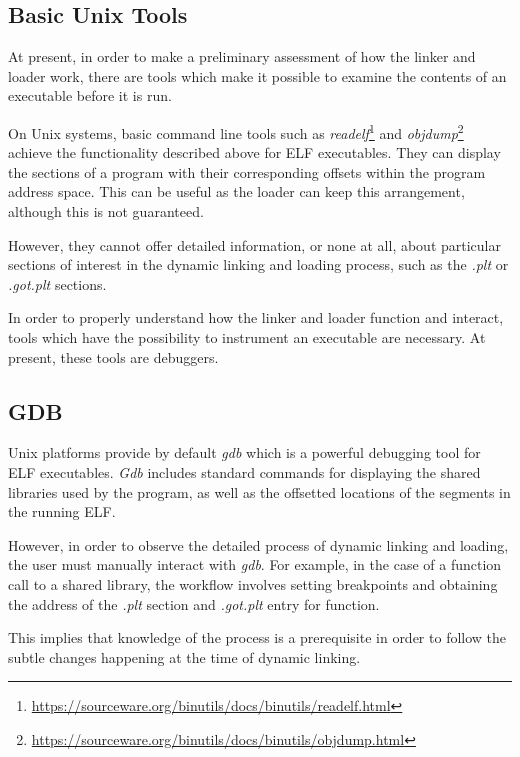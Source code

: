 \subsection{Basic Unix Tools}
\label{sub-sec:basic-unix-tools}

At present, in order to make a preliminary assessment of how the linker and loader work, there are tools which make it possible to examine the contents of an executable before it is run. 

On Unix systems, basic command line tools such as \textit{readelf}\footnote{\url{https://sourceware.org/binutils/docs/binutils/readelf.html}} and \textit{objdump}\footnote{\url{https://sourceware.org/binutils/docs/binutils/objdump.html}} achieve the functionality described above for ELF executables. They can display the sections of a program with their corresponding offsets within the program address space. This can be useful as the loader can keep this arrangement, although this is not guaranteed.

However, they cannot offer detailed information, or none at all, about particular sections of interest in the dynamic linking and loading process, such as the \textit{.plt} or \textit{.got.plt} sections.

In order to properly understand how the linker and loader function and interact, tools which have the possibility to instrument an executable are necessary. At present, these tools are debuggers.

\subsection{GDB}
\label{sub-sec:gdb}

Unix platforms provide by default \textit{gdb} which is a powerful debugging tool for ELF executables. \textit{Gdb} includes standard commands for displaying the shared libraries used by the program, as well as the offsetted locations of the segments in the running ELF.

However, in order to observe the detailed process of dynamic linking and loading, the user must manually interact with \textit{gdb}. For example, in the case of a function call to a shared library,  the workflow involves setting breakpoints and obtaining the address of the \textit{.plt} section and \textit{.got.plt} entry for function.

This implies that knowledge of the process is a prerequisite in order to follow the subtle changes happening at the time of dynamic linking.

